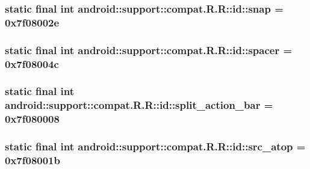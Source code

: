 \hypertarget{classandroid_1_1support_1_1compat_1_1_r_1_1id_c143561c14c179cab9527ddf52d14058}{
\subsubsection[{snap}]{\setlength{\rightskip}{0pt plus 5cm}static final int android::support::compat.R.R::id::snap = 0x7f08002e}}
\label{classandroid_1_1support_1_1compat_1_1_r_1_1id_c143561c14c179cab9527ddf52d14058}


\hypertarget{classandroid_1_1support_1_1compat_1_1_r_1_1id_2eea9a7c89ae366f3c2a85474343b852}{
\subsubsection[{spacer}]{\setlength{\rightskip}{0pt plus 5cm}static final int android::support::compat.R.R::id::spacer = 0x7f08004c}}
\label{classandroid_1_1support_1_1compat_1_1_r_1_1id_2eea9a7c89ae366f3c2a85474343b852}


\hypertarget{classandroid_1_1support_1_1compat_1_1_r_1_1id_c14fde21d4942dcb911324d0942cea1b}{
\subsubsection[{split\_\-action\_\-bar}]{\setlength{\rightskip}{0pt plus 5cm}static final int android::support::compat.R.R::id::split\_\-action\_\-bar = 0x7f080008}}
\label{classandroid_1_1support_1_1compat_1_1_r_1_1id_c14fde21d4942dcb911324d0942cea1b}


\hypertarget{classandroid_1_1support_1_1compat_1_1_r_1_1id_3bc6ca316c94d090347b43f561985d4e}{
\subsubsection[{src\_\-atop}]{\setlength{\rightskip}{0pt plus 5cm}static final int android::support::compat.R.R::id::src\_\-atop = 0x7f08001b}}
\label{classandroid_1_1support_1_1compat_1_1_r_1_1id_3bc6ca316c94d090347b43f561985d4e}


